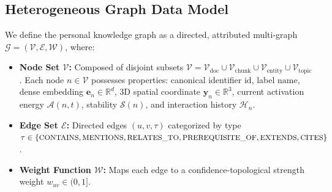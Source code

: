 \subsection{Heterogeneous Graph Data Model}
We define the personal knowledge graph as a directed, attributed multi-graph $\mathcal{G} = (\mathcal{V}, \mathcal{E}, \mathcal{W})$, where:
\begin{itemize}
    \item \textbf{Node Set $\mathcal{V}$:} Composed of disjoint subsets $\mathcal{V} = \mathcal{V}_{\text{doc}} \cup \mathcal{V}_{\text{chunk}} \cup \mathcal{V}_{\text{entity}} \cup \mathcal{V}_{\text{topic}}$. Each node $n \in \mathcal{V}$ possesses properties: canonical identifier $\text{id}$, label $\text{name}$, dense embedding $\mathbf{e}_n \in \mathbb{R}^d$, 3D spatial coordinate $\mathbf{y}_n \in \mathbb{R}^3$, current activation energy $\mathcal{A}(n, t)$, stability $\mathcal{S}(n)$, and interaction history $\mathcal{H}_n$.
    \item \textbf{Edge Set $\mathcal{E}$:} Directed edges $(u, v, \tau)$ categorized by type $\tau \in \{\text{\small CONTAINS}, \text{\small MENTIONS}, \text{\small RELATES\_TO}, \text{\small PREREQUISITE\_OF}, \text{\small EXTENDS}, \text{\small CITES}\}$.
    \item \textbf{Weight Function $\mathcal{W}$:} Maps each edge to a confidence-topological strength weight $w_{uv} \in (0, 1]$.
\end{itemize}
